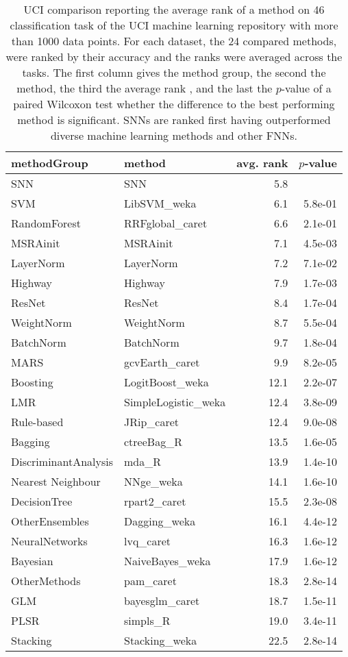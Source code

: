 \documentclass{article}
\begin{document}
\begin{table}[ht]
\caption[Method comparison on large UCI data sets]{UCI comparison reporting the average rank
of a method on 46 classification task of the 
UCI machine learning repository with more than 1000 data points. 
For each dataset, the 24 compared methods, 
were ranked by their
accuracy and the ranks were averaged across the tasks. 
The first column gives the method group, the second the 
method, the third  
the average rank , and the last the $p$-value 
of a paired Wilcoxon test whether the difference to the best performing 
method is significant.
SNNs are ranked first having outperformed diverse machine learning methods and
other FNNs.  \label{tab:uciS2}}

\centering
\begin{tabular}{llrr}
  \toprule
 methodGroup & method & avg. rank & $p$-value \\ 
  \midrule
  SNN & SNN &  5.8 & \\ 
  SVM & LibSVM\_weka &  6.1 & 5.8e-01 \\ 
  RandomForest & RRFglobal\_caret &  6.6 & 2.1e-01 \\ 
  MSRAinit & MSRAinit &  7.1 & 4.5e-03 \\ 
  LayerNorm & LayerNorm &  7.2 & 7.1e-02 \\ 
  Highway & Highway &  7.9 & 1.7e-03 \\ 
  ResNet & ResNet &  8.4 & 1.7e-04 \\ 
  WeightNorm & WeightNorm &  8.7 & 5.5e-04 \\ 
  BatchNorm & BatchNorm &  9.7 & 1.8e-04 \\ 
  MARS & gcvEarth\_caret &  9.9 & 8.2e-05 \\ 
  Boosting & LogitBoost\_weka & 12.1 & 2.2e-07 \\ 
  LMR & SimpleLogistic\_weka & 12.4 & 3.8e-09 \\ 
  Rule-based & JRip\_caret & 12.4 & 9.0e-08 \\ 
  Bagging & ctreeBag\_R & 13.5 & 1.6e-05 \\ 
  DiscriminantAnalysis & mda\_R & 13.9 & 1.4e-10 \\ 
  Nearest Neighbour & NNge\_weka & 14.1 & 1.6e-10 \\ 
  DecisionTree & rpart2\_caret & 15.5 & 2.3e-08 \\ 
  OtherEnsembles & Dagging\_weka & 16.1 & 4.4e-12 \\ 
  NeuralNetworks & lvq\_caret & 16.3 & 1.6e-12 \\ 
  Bayesian & NaiveBayes\_weka & 17.9 & 1.6e-12 \\ 
  OtherMethods & pam\_caret & 18.3 & 2.8e-14 \\ 
  GLM & bayesglm\_caret & 18.7 & 1.5e-11 \\ 
  PLSR & simpls\_R & 19.0 & 3.4e-11 \\ 
  Stacking & Stacking\_weka & 22.5 & 2.8e-14 \\ 
   \bottomrule
\end{tabular}
\end{table}
\end{document}
